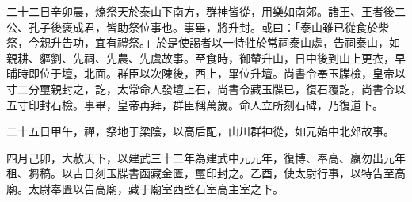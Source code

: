 \begin{pinyinscope}
二十二日辛卯晨，燎祭天於泰山下南方，群神皆從，用樂如南郊。諸王、王者後二公、孔子後褒成君，皆助祭位事也。事畢，將升封。或曰：「泰山雖已從食於柴祭，今親升告功，宜有禮祭。」於是使謁者以一特牲於常祠泰山處，告祠泰山，如親耕、貙劉、先祠、先農、先虞故事。至食時，御輦升山，日中後到山上更衣，早晡時即位于壇，北面。群臣以次陳後，西上，畢位升壇。尚書令奉玉牒檢，皇帝以寸二分璽親封之，訖，太常命人發壇上石，尚書令藏玉牒已，復石覆訖，尚書令以五寸印封石檢。事畢，皇帝再拜，群臣稱萬歲。命人立所刻石碑，乃復道下。

二十五日甲午，禪，祭地于梁陰，以高后配，山川群神從，如元始中北郊故事。

四月己卯，大赦天下，以建武三十二年為建武中元元年，復博、奉高、嬴勿出元年租、芻稿。以吉日刻玉牒書函藏金匱，璽印封之。乙酉，使太尉行事，以特告至高廟。太尉奉匱以告高廟，藏于廟室西壁石室高主室之下。


\end{pinyinscope}